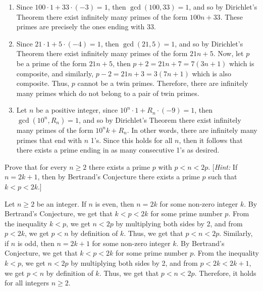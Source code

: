 \begin{solution}
    \begin{enumerate}
        \item Since $100\cdot 1 + 33\cdot (-3) = 1$, then $\gcd(100, 33) = 1$, and so by Dirichlet's Theorem there exist infinitely many primes of the form $100n + 33$. These primes are precisely the ones ending with $33$.
        \item Since $21\cdot 1 + 5\cdot (-4) = 1$, then $\gcd(21, 5) = 1$, and so by Dirichlet's Theorem there exist infinitely many primes of the form $21n + 5$. Now, let $p$ be a prime of the form $21n + 5$, then $p + 2 = 21n + 7 = 7(3n + 1)$ which is composite, and similarly, $p - 2 = 21n + 3 = 3(7n + 1)$ which is also composite. Thus, $p$ cannot be a twin primes. Therefore, there are infinitely many primes which do not belong to a pair of twin primes.
        \item Let $n$ be a positive integer, since $10^n\cdot 1 + R_n\cdot (-9) = 1$, then $\gcd(10^n, R_n) = 1$, and so by Dirichlet's Theorem there exist infinitely many primes of the form $10^nk + R_n$. In other words, there are infinitely many primes that end with $n$ 1's. Since this holds for all $n$, then it follows that there exists a prime ending in as many consecutive 1's as desired. \\
    \end{enumerate}
\end{solution}

\begin{exercise}
    Prove that for every $n \geq 2$ there exists a prime $p$ with $p < n < 2p$. [\textit{Hint:} If $n = 2k+1$, then by Bertrand's Conjecture there exists a prime $p$ such that $k < p < 2k$.] \\
\end{exercise}

\begin{solution}
    Let $n \geq 2$ be an integer. If $n$ is even, then $n = 2k$ for some non-zero integer $k$. By Bertrand's Conjecture, we get that $k < p < 2k$ for some prime number $p$. From the inequality $k < p$, we get $n < 2p$ by multiplying both sides by 2, and from $p < 2k$, we get $p < n$ by definition of $k$. Thus, we get that $p < n < 2p$. Similarly, if $n$ is odd, then $n = 2k + 1$ for some non-zero integer $k$. By Bertrand's Conjecture, we get that $k < p < 2k$ for some prime number $p$. From the inequality $k < p$, we get $n < 2p$ by multiplying both sides by 2, and from $p < 2k < 2k+ 1$, we get $p < n$ by definition of $k$. Thus, we get that $p < n < 2p$. Therefore, it holds for all integers $n \geq 2$. \\
\end{solution}

